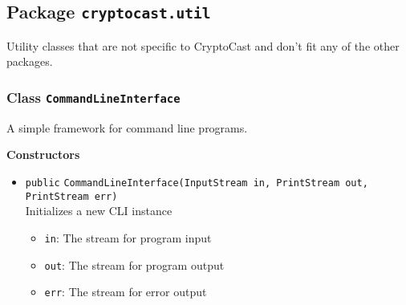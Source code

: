 \subsection{Package \lstinline!cryptocast.util!}
Utility classes that are not specific to CryptoCast and don't fit any of the other packages.
\subsubsection{Class \lstinline|CommandLineInterface|}
A simple framework for command line programs. \\





\textbf{Constructors}
\begin{itemize}
\item \lstinline|public| \lstinline|CommandLineInterface|\lstinline|(InputStream in, PrintStream out, PrintStream err)|\\
Initializes a new CLI instance
\begin{itemize}
\item \lstinline|in|: The stream for program input
\item \lstinline|out|: The stream for program output
\item \lstinline|err|: The stream for error output
\end{itemize}



\end{itemize}


